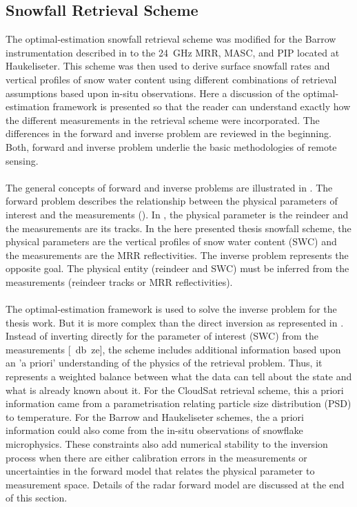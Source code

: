 
\subsection{Snowfall Retrieval Scheme}\label{sec:ret_scheme}

The optimal-estimation snowfall retrieval scheme was modified for the Barrow instrumentation described in \citet{cooper_variational_2017} to the \SI{24}{\giga\hertz} MRR, MASC, and PIP located at Haukeliseter. This scheme was then used to derive surface snowfall rates and vertical profiles of snow water content using different combinations of retrieval assumptions based upon in-situ observations.
Here a discussion of the optimal-estimation framework is presented so that the reader can understand exactly how the different measurements in the retrieval scheme were incorporated. The differences in the forward and inverse problem are reviewed in the beginning. Both, forward and inverse problem underlie the basic methodologies of remote sensing.
\\
\\
The general concepts of forward and inverse problems are illustrated in .  The forward problem describes the relationship between the physical parameters of interest and the measurements (). In , the physical parameter is the reindeer and the measurements are its tracks. In the here presented thesis snowfall scheme, the physical parameters are the vertical profiles of snow water content (SWC) and the measurements are the MRR reflectivities.  The inverse problem represents the opposite goal.  The physical entity (reindeer and SWC) must be inferred from the measurements (reindeer tracks or MRR reflectivities).
\\
\\
The optimal-estimation framework is used to solve the inverse problem for the thesis work. But it is more complex than the direct inversion as represented in . Instead of inverting directly for the parameter of interest (SWC) from the measurements [\SI{}{\decibel ze}], the scheme includes additional information based upon an 'a priori' understanding of the physics of the retrieval problem. Thus, it represents a weighted balance between what the data can tell about the state and what is already known about it. For the CloudSat retrieval scheme, this a priori information came from a parametrisation relating particle size distribution (PSD) to temperature. For the Barrow and Haukeliseter schemes, the a priori information could also come from the in-situ observations of snowflake microphysics. These constraints also add numerical stability to the inversion process when there are either calibration errors in the measurements or uncertainties in the forward model that relates the physical parameter to measurement space. Details of the radar forward model are discussed at the end of this section.
